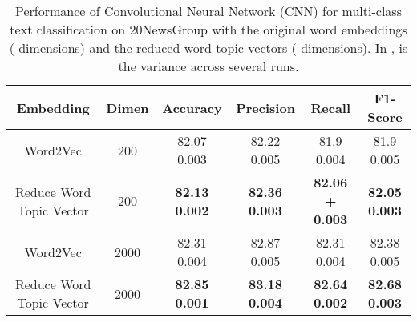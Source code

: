 \documentclass{ecai}
\begin{document}
\begin{table*}
\captionsetup{font=small, skip=0pt}
\caption{Performance of Convolutional Neural Network (CNN) for multi-class text classification on 20NewsGroup with the original word embeddings ( dimensions) and the reduced word topic vectors ( dimensions). In ,  is the variance across several runs.}
\small
\begin{center}
\begin{tabular}{ c|c|c|c|c|c }
\hline
\bf Embedding &\bf Dimen &\bf Accuracy &\bf Precision &\bf Recall &\bf F1-Score \\
\hline
Word2Vec & 200 & 82.07  0.003  & 82.22  0.005 & 81.9  0.004 & 81.9  0.005\\
Reduce Word Topic Vector & 200 &\bf 82.13   0.002 &\bf 82.36  0.003 &\bf 82.06 +  0.003 &\bf 82.05  0.003\\ \hline
Word2Vec & 2000 & 82.31  0.004 & 82.87  0.005 &   82.31  0.004 & 82.38  0.005 \\
Reduce Word Topic Vector & 2000 &\bf 82.85   0.001 &\bf 83.18  0.004  &\bf 82.64  0.002 &\bf 82.68  0.003 \\
\hline
\end{tabular}
\end{center}
\label{table:CNNResults20NewsGroup}
\vspace{-0.5em}
\end{table*}
\end{document}
